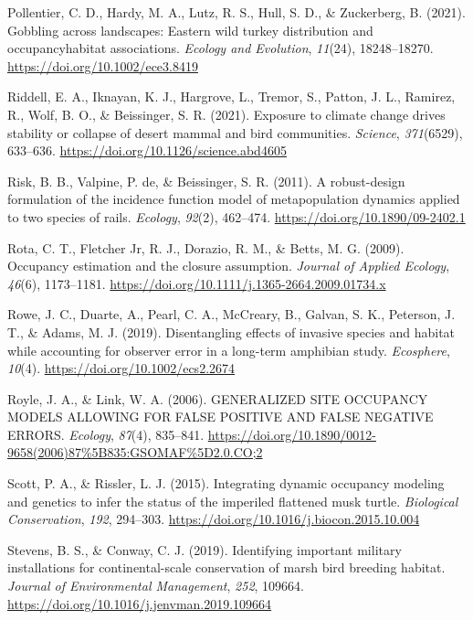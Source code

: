 \documentclass[
]{article}
\newlength{\cslhangindent}
\newenvironment{CSLReferences}[2] %
 {\begin{list}{}{%
  \setlength{\itemindent}{0pt}
  \setlength{\leftmargin}{0pt}
  \setlength{\parsep}{0pt}
  \ifodd #1
   \setlength{\leftmargin}{\cslhangindent}
   \setlength{\itemindent}{-1\cslhangindent}
  \fi
  \setlength{\itemsep}{#2\baselineskip}}}
 {\end{list}}
\begin{document}
\begin{CSLReferences}{1}{0}
Pollentier, C. D., Hardy, M. A., Lutz, R. S., Hull, S. D., \&
Zuckerberg, B. (2021). Gobbling across landscapes: Eastern wild turkey
distribution and occupancy{\textendash}habitat associations.
\emph{Ecology and Evolution}, \emph{11}(24), 18248--18270.
\url{https://doi.org/10.1002/ece3.8419}

Riddell, E. A., Iknayan, K. J., Hargrove, L., Tremor, S., Patton, J. L.,
Ramirez, R., Wolf, B. O., \& Beissinger, S. R. (2021). Exposure to
climate change drives stability or collapse of desert mammal and bird
communities. \emph{Science}, \emph{371}(6529), 633--636.
\url{https://doi.org/10.1126/science.abd4605}

Risk, B. B., Valpine, P. de, \& Beissinger, S. R. (2011). A
robust-design formulation of the incidence function model of
metapopulation dynamics applied to two species of rails. \emph{Ecology},
\emph{92}(2), 462--474. \url{https://doi.org/10.1890/09-2402.1}

Rota, C. T., Fletcher Jr, R. J., Dorazio, R. M., \& Betts, M. G. (2009).
Occupancy estimation and the closure assumption. \emph{Journal of
Applied Ecology}, \emph{46}(6), 1173--1181.
\url{https://doi.org/10.1111/j.1365-2664.2009.01734.x}

Rowe, J. C., Duarte, A., Pearl, C. A., McCreary, B., Galvan, S. K.,
Peterson, J. T., \& Adams, M. J. (2019). Disentangling effects of
invasive species and habitat while accounting for observer error in a
long{-}term amphibian study. \emph{Ecosphere}, \emph{10}(4).
\url{https://doi.org/10.1002/ecs2.2674}

Royle, J. A., \& Link, W. A. (2006). GENERALIZED SITE OCCUPANCY MODELS
ALLOWING FOR FALSE POSITIVE AND FALSE NEGATIVE ERRORS. \emph{Ecology},
\emph{87}(4), 835--841.
\url{https://doi.org/10.1890/0012-9658(2006)87\%5B835:GSOMAF\%5D2.0.CO;2}

Scott, P. A., \& Rissler, L. J. (2015). Integrating dynamic occupancy
modeling and genetics to infer the status of the imperiled flattened
musk turtle. \emph{Biological Conservation}, \emph{192}, 294--303.
\url{https://doi.org/10.1016/j.biocon.2015.10.004}

Stevens, B. S., \& Conway, C. J. (2019). Identifying important military
installations for continental-scale conservation of marsh bird breeding
habitat. \emph{Journal of Environmental Management}, \emph{252}, 109664.
\url{https://doi.org/10.1016/j.jenvman.2019.109664}


\end{CSLReferences}
\end{document}
